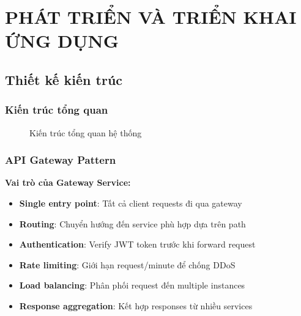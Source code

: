 \documentclass[12pt]{extreport}
\begin{document}
\chapter{PHÁT TRIỂN VÀ TRIỂN KHAI ỨNG DỤNG}

\section{Thiết kế kiến trúc}

\subsection{Kiến trúc tổng quan}

\begin{figure}[H]
    \centering
    \caption{Kiến trúc tổng quan hệ thống}
    \label{fig:kientruc_tongquan}
\end{figure}

\subsection{API Gateway Pattern}

\textbf{Vai trò của Gateway Service:}
\begin{itemize}
    \item \textbf{Single entry point}: Tất cả client requests đi qua gateway
    \item \textbf{Routing}: Chuyển hướng đến service phù hợp dựa trên path
    \item \textbf{Authentication}: Verify JWT token trước khi forward request
    \item \textbf{Rate limiting}: Giới hạn request/minute để chống DDoS
    \item \textbf{Load balancing}: Phân phối request đến multiple instances
    \item \textbf{Response aggregation}: Kết hợp responses từ nhiều services
\end{itemize}
\end{document}
